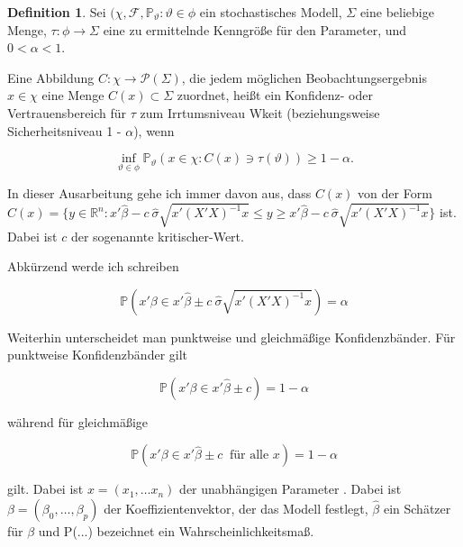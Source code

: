 \documentclass[12pt,a4paper]{article}
\theoremstyle{definition}
\newtheorem{Definition}{Definition}[subsection]
\theoremstyle{definition}
\theoremstyle{definition}
\begin{document}
\begin{Definition}
Sei $( \chi, \mathscr{F} , \mathbb{P}_\vartheta : \vartheta \in \phi $ ein stochastisches Modell, $\Sigma$ eine beliebige Menge, $\tau : \phi \rightarrow \Sigma $ eine zu ermittelnde Kenngröße für den Parameter, und $0 < \alpha < 1$. 

Eine Abbildung $C : \chi \rightarrow \mathscr{P}(\Sigma)$, die jedem möglichen Beobachtungsergebnis $x \in \chi$ eine Menge $C(x) \subset \Sigma$ zuordnet, heißt ein Konfidenz- oder Vertrauensbereich für $\tau$ zum Irrtumsniveau \gls{Wkeit} (beziehungsweise Sicherheitsniveau 1 - $\alpha$), wenn

\begin{equation*}
\inf_{\vartheta \in \phi} \mathbb{P}_{\vartheta}(x \in \chi : C(x) \ni \tau(\vartheta)) \geq 1 - \alpha.
\end{equation*}

\end{Definition}

In dieser Ausarbeitung gehe ich immer davon aus, dass $C(x)$ von der Form $C(x) = \{ y \in \mathbb{R}^n :  x'\hat{\beta} - c ~ \hat{\sigma}\sqrt{x'(X'X)^{-1}x} \leq y \geq x'\hat{\beta} - c ~ \hat{\sigma}\sqrt{x'(X'X)^{-1}x} \}$ ist. Dabei ist $c$ der sogenannte  \gls{kritischer-Wert}.
 
Abkürzend werde ich schreiben

\begin{equation*}
\mathbb{P}(x' \beta \in x'\hat{\beta} \pm c ~ \hat{\sigma}\sqrt{x'(X'X)^{-1}x}) = \alpha
\end{equation*} 

Weiterhin unterscheidet man punktweise und gleichmäßige Konfidenzbänder. Für punktweise Konfidenzbänder gilt

\begin{equation*}
\mathbb{P}(x'\beta \in x' \hat{\beta} \pm c) = 1-\alpha
\end{equation*}

während für gleichmäßige 

\begin{equation*}
\mathbb{P}(x'\beta \in x' \hat{\beta} \pm c ~ \text{ für alle } x) = 1-\alpha
\end{equation*}

gilt. Dabei ist $x=(x_{1}, \ldots x_{n})$ der unabhängigen Parameter . Dabei ist $\beta=(\beta_{0}, \ldots, \beta_{p})$ der Koeffizientenvektor, der das Modell festlegt, $\hat{\beta}$ ein Schätzer für $\beta$ und \gls{P(...)} bezeichnet ein Wahrscheinlichkeitsmaß. 
\end{document}
